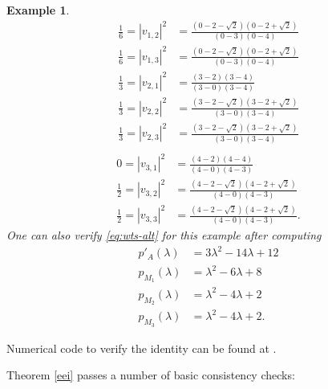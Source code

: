 \documentclass[12pt]{amsart}
\newtheorem{example}[lemma]{Example}
\begin{document}
\begin{example}
\begin{align*}
\frac{1}{6} = |v_{1,2}|^2 &= \frac{(0-2-\sqrt{2})(0-2+\sqrt{2})}{(0-3)(0-4)}\\
\frac{1}{6} = |v_{1,3}|^2 &= \frac{(0-2-\sqrt{2})(0-2+\sqrt{2})}{(0-3)(0-4)}\\[3mm]
%
\frac{1}{3} = |v_{2,1}|^2 &= \frac{(3-2)(3-4)}{(3-0)(3-4)} \\
\frac{1}{3} = |v_{2,2}|^2 &= \frac{(3-2-\sqrt{2})(3-2+\sqrt{2})}{(3-0)(3-4)} \\
\frac{1}{3} = |v_{2,3}|^2 &= \frac{(3-2-\sqrt{2})(3-2+\sqrt{2})}{(3-0)(3-4)} \\[3mm]
\end{align*}
\begin{align*}
0 = |v_{3,1}|^2 &= \frac{(4-2)(4-4)}{(4-0)(4-3)} \\
\frac{1}{2} = |v_{3,2}|^2 &= \frac{(4-2-\sqrt{2})(4-2+\sqrt{2})}{(4-0)(4-3)}\\
\frac{1}{2} = |v_{3,3}|^2 &= \frac{(4-2-\sqrt{2})(4-2+\sqrt{2})}{(4-0)(4-3)}.
\end{align*}
One can also verify \eqref{eq:wts-alt} for this example after computing
\begin{align*}
p'_A(\lambda) &= 3\lambda^2-14\lambda+12 \\
p_{M_1}(\lambda) &= \lambda^2 - 6\lambda + 8 \\
p_{M_2}(\lambda) &= \lambda^2 - 4\lambda + 2 \\
p_{M_3}(\lambda) &= \lambda^2 - 4\lambda + 2.
\end{align*}
\end{example}

Numerical code to verify the identity can be found at \cite{EEIcode}.

Theorem \ref{eei} passes a number of basic consistency checks:
\end{document}
